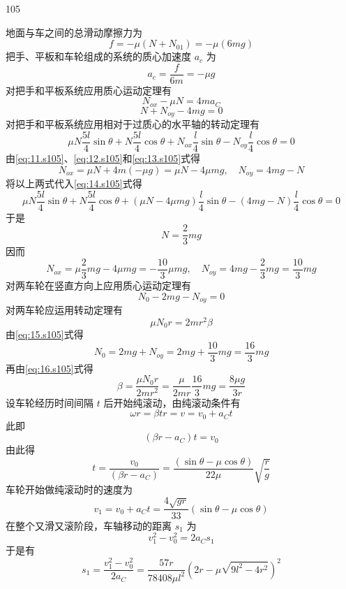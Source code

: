 \begin{solution}{105}
\begin{subsolution}
地面与车之间的总滑动摩擦力为
\begin{equation}
f = -\mu(N + N_{01}) = -\mu(6mg)
\label{eq:10.s105}
\end{equation}
把手、平板和车轮组成的系统的质心加速度 $a_{c}$ 为
\begin{equation}
a_{c} = \frac{f}{6m} = -\mu g
\label{eq:11.s105}
\end{equation}
对把手和平板系统应用质心运动定理有
\begin{equation}
N_{ox} - \mu N = 4m a_{C}
\label{eq:12.s105}
\end{equation}
\begin{equation}
N + N_{oy} - 4mg = 0
\label{eq:13.s105}
\end{equation}
对把手和平板系统应用相对于过质心的水平轴的转动定理有
\begin{equation}
\mu N \frac{5l}{4}\sin\theta + N \frac{5l}{4}\cos\theta + N_{ox}\frac{l}{4}\sin\theta - N_{oy}\frac{l}{4}\cos\theta = 0
\label{eq:14.s105}
\end{equation}
由\eqref{eq:11.s105}、\eqref{eq:12.s105}和\eqref{eq:13.s105}式得
\[
N_{ox} = \mu N + 4m(-\mu g) = \mu N - 4\mu m g,\quad N_{oy} = 4mg - N
\]
将以上两式代入\eqref{eq:14.s105}式得
\[
\mu N \frac{5l}{4}\sin\theta + N \frac{5l}{4}\cos\theta + (\mu N - 4\mu m g)\frac{l}{4}\sin\theta - (4mg - N)\frac{l}{4}\cos\theta = 0
\]
于是
\[
N = \frac{2}{3} m g
\]
因而
\[
N_{ox} = \mu\frac{2}{3}mg - 4\mu m g = -\frac{10}{3}\mu m g,\quad N_{oy} = 4mg - \frac{2}{3}mg = \frac{10}{3}mg
\]
对两车轮在竖直方向上应用质心运动定理有
\begin{equation}
N_{0} - 2mg - N_{oy} = 0
\label{eq:15.s105}
\end{equation}
对两车轮应运用转动定理有
\begin{equation}
\mu N_{0} r = 2m r^{2} \beta
\label{eq:16.s105}
\end{equation}
由\eqref{eq:15.s105}式得
\[
N_{0} = 2mg + N_{oy} = 2mg + \frac{10}{3}mg = \frac{16}{3}mg
\]
再由\eqref{eq:16.s105}式得
\[
\beta = \frac{\mu N_{0} r}{2m r^{2}} = \frac{\mu}{2m r}\frac{16}{3}mg = \frac{8\mu g}{3r}
\]
设车轮经历时间间隔 $t$ 后开始纯滚动，由纯滚动条件有
\begin{equation}
\omega r = \beta t r = v = v_{0} + a_{C} t
\label{eq:17.s105}
\end{equation}
此即
\[
(\beta r - a_{C}) t = v_{0}
\]
由此得
\[
t = \frac{v_{0}}{(\beta r - a_{C})} = \frac{(\sin\theta - \mu\cos\theta)}{22\mu}\sqrt{\frac{r}{g}}
\]
车轮开始做纯滚动时的速度为
\begin{equation}
v_{1} = v_{0} + a_{C} t = \frac{4\sqrt{gr}}{33}(\sin\theta - \mu\cos\theta)
\label{eq:18.s105}
\end{equation}
在整个又滑又滚阶段，车轴移动的距离 $s_{1}$ 为
\[
v_{1}^{2} - v_{0}^{2} = 2 a_{C} s_{1}
\]
于是有
\begin{equation}
s_{1} = \frac{v_{1}^{2} - v_{0}^{2}}{2 a_{C}} = \frac{57 r}{78408 \mu l^{2}} (2r - \mu\sqrt{9l^{2} - 4r^{2}})^{2}
\label{eq:19.s105}
\end{equation}


\end{subsolution}
\end{solution}
